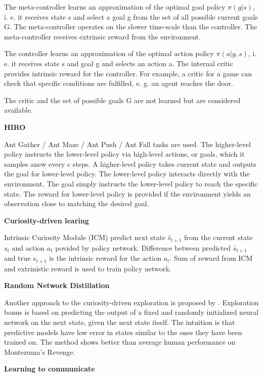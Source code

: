 \documentclass{article}
\begin{document}
The meta-controller learns an approximation of the optimal goal policy $\pi(g|s)$, i. e. it receives state s and select a goal g from the set of all possible current goals G. The meta-controller operates on the slower time-scale than the controller. The meta-controller receives extrinsic reward from the environment.

The controller learns an approximation of the optimal action policy $\pi(a|g,s)$, i. e. it receives state s and goal g and selects an action a. The internal critic provides intrinsic reward for the controller. For example, a critic for a game can check that specific conditions are fulfilled, e. g. an agent reaches the door.

The critic and the set of possible goals G are not learned but are considered available.

\textbf{HIRO}~\citep{Nachum2018DataEfficientHR}

Ant Gather / Ant Maze / Ant Push / Ant Fall tasks are used. The higher-level policy instructs the lower-level policy via high-level actions, or goals, which it samples anew every c steps. A higher-level policy takes current state and outputs the goal for lower-level policy. The lower-level policy interacts directly with the environment. The goal simply instructs the lower-level policy to reach the specific state. The reward for lower-level policy is provided if the environment yields an observation close to matching the desired goal.

\textbf{Curiosity-driven learing}~\citep{Pathak2017CuriosityDrivenEB}

Intrinsic Curiosity Module (ICM) predict next state $\hat{s}_{t+1}$ from the current state $s_t$ and action $a_t$ povided by policy network. Difference between predicted $\hat{s}_{t+1}$ and true $s_{t+1}$ is the intrinsic reward for the action $a_t$. Sum of reward from ICM and extrinistic reward is used to train policy network.

\textbf{Random Network Distillation}

Another approach to the curiosity-driven exploration is proposed by \citep{Burda2019ExplorationBR}. Exploration bonus is based on predicting the output of a fixed and randomly initialized neural network on the next state, given the next state itself. The intuition is that predictive models have low error in states similar to the ones they have been trained on. The method shows better than average human performance on Montezuma’s Revenge.

\textbf{Learning to communicate}~\citep{Mordatch2018EmergenceOG}
\end{document}
